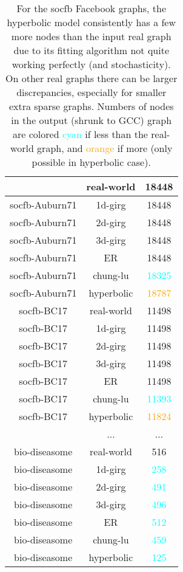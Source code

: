 \begin{table}[]
\begin{tabular}{|c|c|c|}
    \begin{comment}
    socfb-Auburn71 & real-world & 18448 \\ \hline
    socfb-Auburn71 & 1d-girg & 18448 \\ \hline
    socfb-Auburn71 & 2d-girg & 18448 \\ \hline
    socfb-Auburn71 & 3d-girg & 18448 \\ \hline
    socfb-Auburn71 & ER & 18448 \\ \hline
    socfb-Auburn71 & chung-lu & \textcolor{cyan}{18325} \\ \hline
    socfb-Auburn71 & hyperbolic & \textcolor{orange}{18787} \\ \hline
    socfb-BC17 & real-world & 11498 \\ \hline
    socfb-BC17 & 1d-girg & 11498 \\ \hline
    socfb-BC17 & 2d-girg & 11498 \\ \hline
    socfb-BC17 & 3d-girg & 11498 \\ \hline
    socfb-BC17 & ER & 11498 \\ \hline
    socfb-BC17 & chung-lu & \textcolor{cyan}{11393} \\ \hline
    socfb-BC17 & hyperbolic & \textcolor{orange}{11824} \\ \hline
    \end{comment}

    ... & ... & ... \\ \hline

    bio-diseasome & real-world & 516 \\ \hline
    bio-diseasome & 1d-girg & \textcolor{cyan}{258} \\ \hline
    bio-diseasome & 2d-girg & \textcolor{cyan}{491} \\ \hline
    bio-diseasome & 3d-girg & \textcolor{cyan}{496} \\ \hline
    bio-diseasome & ER & \textcolor{cyan}{512} \\ \hline
    bio-diseasome & chung-lu & \textcolor{cyan}{459} \\ \hline
    bio-diseasome & hyperbolic & \textcolor{cyan}{125} \\ \hline

    \end{tabular}
    \caption{
    For the socfb Facebook graphs, the hyperbolic model consistently has a few more nodes than the input real graph due to its fitting algorithm not quite working perfectly (and stochasticity).
    On other real graphs there can be larger discrepancies, especially for smaller extra sparse graphs.
    Numbers of nodes in the output (shrunk to GCC) graph are colored \textcolor{cyan}{cyan} if less than the real-world graph, and \textcolor{orange}{orange} if more (only possible in hyperbolic case).
    }
    \label{tab:your_label}
\end{table}
    



